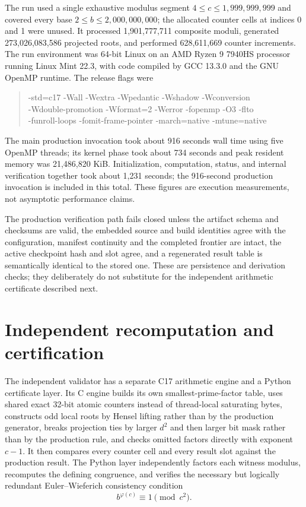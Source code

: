 \documentclass[11pt]{article}
\begin{document}
The run used a single exhaustive modulus segment
$4\leq c\leq1{,}999{,}999{,}999$ and covered every base
$2\leq b\leq2{,}000{,}000{,}000$; the allocated counter cells at indices 0
and 1 were unused.  It processed 1,901,777,711 composite
moduli, generated 273,026,083,586 projected roots, and performed 628,611,669
counter increments.  The run environment was 64-bit Linux on an AMD Ryzen 9
7940HS processor running Linux Mint 22.3, with code compiled by GCC 13.3.0
and the GNU OpenMP runtime.  The release flags were
\begin{quote}
\small\ttfamily
-std=c17 -Wall -Wextra -Wpedantic -Wshadow -Wconversion\\
-Wdouble-promotion -Wformat=2 -Werror -fopenmp -O3 -flto\\
-funroll-loops -fomit-frame-pointer -march=native -mtune=native
\end{quote}
The main production invocation took about 916 seconds wall time using five
OpenMP threads; its kernel phase took about 734 seconds and peak resident memory
was 21,486,820 KiB.  Initialization, computation, status, and internal
verification together took about 1,231 seconds; the 916-second production
invocation is included in this total.  These figures are execution
measurements, not asymptotic performance claims.

The production verification path fails closed unless the artifact schema and
checksums are valid, the embedded source and build identities agree with the
configuration, manifest continuity and the completed frontier are intact, the
active checkpoint hash and slot agree, and a regenerated result table is
semantically identical to the stored one.  These are persistence and
derivation checks; they deliberately do not substitute for the independent
arithmetic certificate described next.

\section{Independent recomputation and certification}

The independent validator has a separate C17 arithmetic engine and a Python
certificate layer.  Its C engine builds its own smallest-prime-factor table,
uses shared exact 32-bit atomic counters instead of thread-local saturating
bytes, constructs odd local roots by Hensel lifting rather than by the
production generator, breaks projection ties by larger $d^2$ and then larger
bit mask rather than by the production rule, and checks omitted
factors directly with exponent $c-1$.  It then compares every counter cell
and every result slot against the production result.  The Python layer
independently factors each witness modulus, recomputes the defining
congruence, and verifies the necessary but logically redundant
Euler--Wieferich consistency condition
\begin{equation}\label{eq:euler-check}
 b^{\varphi(c)}\equiv1\pmod{c^2}.
\end{equation}
\end{document}
